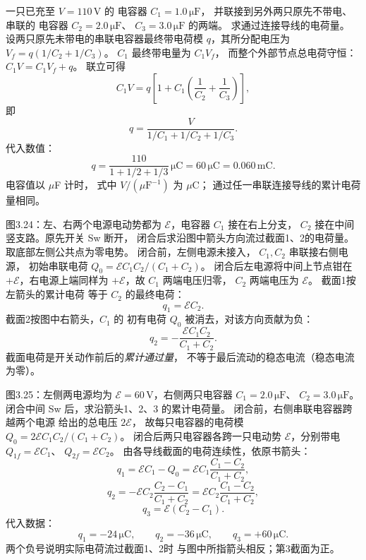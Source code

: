 一只已充至 $V=110\,\mathrm V$ 的
电容器 $C_1=1.0\,\mathrm{\mu F}$，
并联接到另外两只原先不带电、串联的
电容器 $C_2=2.0\,\mathrm{\mu F}$、
$C_3=3.0\,\mathrm{\mu F}$ 的两端。
求通过连接导线的电荷量。
\exsolution
设两只原先未带电的串联电容器最终带电荷模
$q$，其所分配电压为
$V_f=q(1/C_2+1/C_3)$。
$C_1$ 最终带电量为 $C_1V_f$，
而整个外部节点总电荷守恒：
$C_1V=C_1V_f+q$。
联立可得
\[
C_1V=q\left[1+C_1
\left(\frac1{C_2}+\frac1{C_3}\right)\right],
\]
即
\[
\boxed{q=\frac{V}
{1/C_1+1/C_2+1/C_3}}.
\]
代入数值：
\[
\boxed{q=\frac{110}{1+1/2+1/3}\,\mathrm{\mu C}
=60\,\mathrm{\mu C}=0.060\,\mathrm{mC}}.
\]
\excheck 电容值以 $\mu$F 计时，
式中 $V/(\mu\mathrm F^{-1})$ 为 $\mu$C；
通过任一串联连接导线的累计电荷量相同。

图3.24：左、右两个电源电动势都为
$\mathcal E$，电容器 $C_1$ 接在右上分支，
$C_2$ 接在中间竖支路。原先开关 Sw 断开，
闭合后求沿图中箭头方向流过截面1、2的电荷量。
\exsolution
取底部左侧公共点为零电势。
闭合前，左侧电源未接入，
$C_1,C_2$ 串联接右侧电源，
初始串联电荷
$Q_0=\mathcal E C_1C_2/(C_1+C_2)$。
闭合后左电源将中间上节点钳在
$+\mathcal E$，右电源上端同样为
$+\mathcal E$，故 $C_1$ 两端电压归零，
$C_2$ 两端电压为 $\mathcal E$。
截面1按左箭头的累计电荷
等于 $C_2$ 的最终电荷：
\[
\boxed{q_1=\mathcal E C_2}.
\]
截面2按图中右箭头，$C_1$ 的
初有电荷 $Q_0$ 被消去，对该方向贡献为负：
\[
\boxed{q_2=-\frac{\mathcal E C_1C_2}{C_1+C_2}}.
\]
\excheck 截面电荷是开关动作前后的\emph{累计通过量}，
不等于最后流动的稳态电流（稳态电流为零）。

图3.25：左侧两电源均为
$\mathcal E=60\,\mathrm V$，右侧两只电容器
$C_1=2.0\,\mathrm{\mu F}$、
$C_2=3.0\,\mathrm{\mu F}$。
闭合中间 Sw 后，求沿箭头1、2、3
的累计电荷量。
\exsolution
闭合前，右侧串联电容器跨越两个电源
给出的总电压 $2\mathcal E$，
故每只电容器的电荷模
$Q_0=2\mathcal E C_1C_2/(C_1+C_2)$。
闭合后两只电容器各跨一只电动势
$\mathcal E$，分别带电
$Q_{1f}=\mathcal E C_1$、
$Q_{2f}=\mathcal E C_2$。
由各导线截面的电荷连续性，依原书箭头：
\[
\boxed{q_1=\mathcal E C_1-Q_0
=\mathcal E C_1\frac{C_1-C_2}{C_1+C_2}},
\]
\[
\boxed{q_2=-\mathcal E C_2
\frac{C_2-C_1}{C_1+C_2}
=\mathcal E C_2\frac{C_1-C_2}{C_1+C_2}},
\]
\[
\boxed{q_3=\mathcal E(C_2-C_1)}.
\]
代入数据：
\[
\boxed{q_1=-24\,\mathrm{\mu C},\qquad
q_2=-36\,\mathrm{\mu C},\qquad
q_3=+60\,\mathrm{\mu C}}.
\]
\excheck 两个负号说明实际电荷流过截面1、2时
与图中所指箭头相反；第3截面为正。

